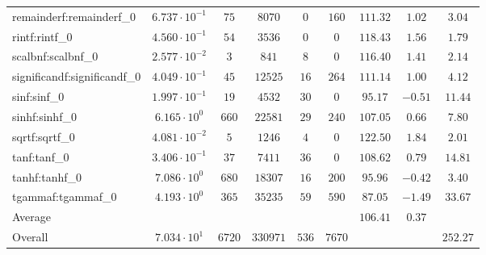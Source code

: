 \begin{tabular}{|l|c|c|c|c|c|c|c|c|}
remainderf:remainderf\_0     & $ 6.737 \cdot 10^{-1} $ & $ 75     $ & $ 8070   $ & $ 0   $ & $ 160  $ & $ 111.32      $ & $ 1.02    $ & $ 3.04    $ \\
rintf:rintf\_0               & $ 4.560 \cdot 10^{-1} $ & $ 54     $ & $ 3536   $ & $ 0   $ & $ 0    $ & $ 118.43      $ & $ 1.56    $ & $ 1.79    $ \\
scalbnf:scalbnf\_0           & $ 2.577 \cdot 10^{-2} $ & $ 3      $ & $ 841    $ & $ 8   $ & $ 0    $ & $ 116.40      $ & $ 1.41    $ & $ 2.14    $ \\
significandf:significandf\_0 & $ 4.049 \cdot 10^{-1} $ & $ 45     $ & $ 12525  $ & $ 16  $ & $ 264  $ & $ 111.14      $ & $ 1.00    $ & $ 4.12    $ \\
sinf:sinf\_0                 & $ 1.997 \cdot 10^{-1} $ & $ 19     $ & $ 4532   $ & $ 30  $ & $ 0    $ & $ 95.17       $ & $ -0.51   $ & $ 11.44   $ \\
sinhf:sinhf\_0               & $ 6.165 \cdot 10^{0}  $ & $ 660    $ & $ 22581  $ & $ 29  $ & $ 240  $ & $ 107.05      $ & $ 0.66    $ & $ 7.80    $ \\
sqrtf:sqrtf\_0               & $ 4.081 \cdot 10^{-2} $ & $ 5      $ & $ 1246   $ & $ 4   $ & $ 0    $ & $ 122.50      $ & $ 1.84    $ & $ 2.01    $ \\
tanf:tanf\_0                 & $ 3.406 \cdot 10^{-1} $ & $ 37     $ & $ 7411   $ & $ 36  $ & $ 0    $ & $ 108.62      $ & $ 0.79    $ & $ 14.81   $ \\
tanhf:tanhf\_0               & $ 7.086 \cdot 10^{0}  $ & $ 680    $ & $ 18307  $ & $ 16  $ & $ 200  $ & $ 95.96       $ & $ -0.42   $ & $ 3.40    $ \\
tgammaf:tgammaf\_0           & $ 4.193 \cdot 10^{0}  $ & $ 365    $ & $ 35235  $ & $ 59  $ & $ 590  $ & $ 87.05       $ & $ -1.49   $ & $ 33.67   $ \\
\hline
Average                      & $                     $ & $        $ & $        $ & $     $ & $      $ & $ 106.41      $ & $ 0.37    $ & $         $ \\
\hline
Overall                      & $ 7.034 \cdot 10^{1}  $ & $ 6720   $ & $ 330971 $ & $ 536 $ & $ 7670 $ & $             $ & $         $ & $ 252.27  $ \\
\hline
\end{tabular}
